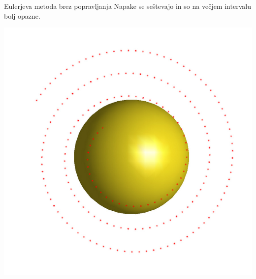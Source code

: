 \documentclass{beamer}
\begin{document}
\begin{frame}{Eulerjeva metoda brez popravljanja}
	Napake se seštevajo in so na večjem intervalu bolj opazne.\\
	\begin{center}
		\includegraphics[scale=0.30]{eul2}
	\end{center}
	
\end{frame}
\end{document}
